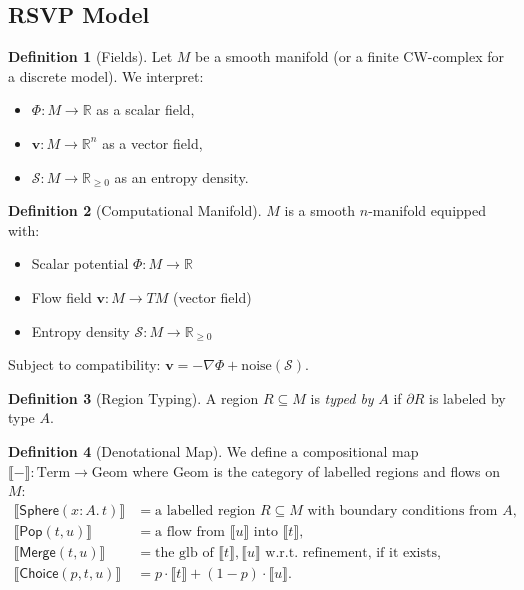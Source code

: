 \documentclass[12pt]{article}
\newcommand{\Sphere}{\mathsf{Sphere}}
\newcommand{\Pop}{\mathsf{Pop}}
\newcommand{\Merge}{\mathsf{Merge}}
\newcommand{\Choice}{\mathsf{Choice}}
\newcommand{\Interp}[1]{\llbracket #1 \rrbracket}
\newcommand{\Field}{\Phi}
\newcommand{\Flow}{\mathbf{v}}
\newcommand{\Entropy}{\mathcal{S}}
\theoremstyle{definition}
\newtheorem{definition}{Definition}
\begin{document}
\subsection{RSVP Model}
\begin{definition}[Fields]
Let $M$ be a smooth manifold (or a finite CW-complex for a discrete model). We interpret:
\begin{itemize}[noitemsep]
  \item $\Field : M \to \mathbb{R}$ as a scalar field,
  \item $\mathbf{v} : M \to \mathbb{R}^n$ as a vector field,
  \item $\mathcal{S} : M \to \mathbb{R}_{\ge 0}$ as an entropy density.
\end{itemize}
\end{definition}

\begin{definition}[Computational Manifold]
$M$ is a smooth $n$-manifold equipped with:
\begin{itemize}
\item Scalar potential $\Field : M \to \mathbb{R}$
\item Flow field $\Flow : M \to TM$ (vector field)
\item Entropy density $\Entropy : M \to \mathbb{R}_{\geq 0}$
\end{itemize}
Subject to compatibility: $\Flow = -\nabla \Field + \text{noise}(\Entropy)$.
\end{definition}

\begin{definition}[Region Typing]
A region $R \subseteq M$ is \emph{typed by} $A$ if $\partial R$ is labeled by type $A$.
\end{definition}

\begin{definition}[Denotational Map]
We define a compositional map $\Interp{-} : \text{Term} \to \text{Geom}$ where $\text{Geom}$ is the category of labelled regions and flows on $M$:
\begin{align*}
\Interp{\Sphere(x\!:\!A.\,t)} &= \text{a labelled region } R \subseteq M \text{ with boundary conditions from } A,\\
\Interp{\Pop(t,u)} &= \text{a flow from }\Interp{u}\text{ into }\Interp{t},\\
\Interp{\Merge(t,u)} &= \text{the glb of } \Interp{t},\Interp{u} \text{ w.r.t.\ refinement, if it exists},\\
\Interp{\Choice(p,t,u)} &= p\cdot \Interp{t} + (1-p)\cdot \Interp{u}.
\end{align*}
\end{definition}
\end{document}
